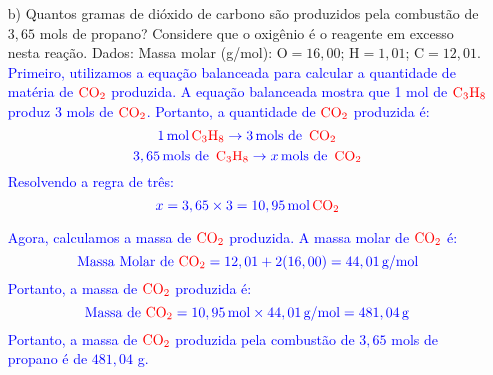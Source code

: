 \documentclass[a4paper, 12pt]{article}
\begin{document}
\begin{enumerate}
\begin{enumerate}[align=left, labelsep=-0.5em]
              \item[b)] Quantos gramas de dióxido de carbono são produzidos pela combustão
                    de $3,65$ mols de propano? Considere que o oxigênio é o reagente em
                    excesso nesta reação. Dados: Massa molar (g/mol): $\text{O}= 16,00$;
                    $\text{H}= 1,01$; $\text{C}= 12,01$.
                    \\[10pt]
                    \textcolor{blue}{Primeiro, utilizamos a equação balanceada para calcular a quantidade de matéria de \(\textcolor{red}{\text{CO}_{2}}\) produzida. A equação balanceada mostra que 1 mol de \(\textcolor{red}{\text{C}_{3}\text{H}_{8}}\) produz 3 mols de \(\textcolor{red}{\text{CO}_{2}}\). Portanto, a quantidade de \(\textcolor{red}{\text{CO}_{2}}\) produzida é:}
                    \[
                        \textcolor{blue}{1 \, \text{mol} \, \textcolor{red}{\text{C}_{3}\text{H}_{8}} \rightarrow 3 \, \text{mols de } \, \textcolor{red}{\text{CO}_{2}}}
                    \]
                    \[
                        \textcolor{blue}{3,65 \, \text{mols de } \, \textcolor{red}{\text{C}_{3}\text{H}_{8}} \rightarrow x \, \text{mols de } \, \textcolor{red}{\text{CO}_{2}}}
                    \]
                    \textcolor{blue}{Resolvendo a regra de três:}
                    \[
                        \textcolor{blue}{x = 3,65 \times 3 = 10,95 \, \text{mol} \, \textcolor{red}{\text{CO}_{2}}}
                    \]

                    \textcolor{blue}{Agora, calculamos a massa de \(\textcolor{red}{\text{CO}_{2}}\) produzida. A massa molar de \(\textcolor{red}{\text{CO}_{2}}\) é:}
                    \[
                        \textcolor{blue}{\text{Massa Molar de } \textcolor{red}{\text{CO}_{2}} = 12,01 + 2(16,00) = 44,01 \, \text{g/mol}}
                    \]
                    \textcolor{blue}{Portanto, a massa de \(\textcolor{red}{\text{CO}_{2}}\) produzida é:}
                    \[
                        \textcolor{blue}{\text{Massa de } \textcolor{red}{\text{CO}_{2}} = 10,95 \, \text{mol} \times 44,01 \, \text{g/mol} = 481,04 \, \text{g}}
                    \]
                    \textcolor{blue}{Portanto, a massa de \(\textcolor{red}{\text{CO}_{2}}\) produzida pela combustão de $3,65$ mols de propano é de $481,04$ g.}
          \end{enumerate}
\end{enumerate}
\end{document}
